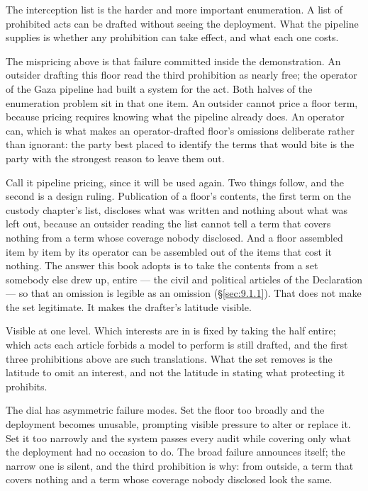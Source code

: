 
The interception list is the harder and more important enumeration. A list of prohibited acts can be drafted without seeing the deployment. What the pipeline supplies is whether any prohibition can take effect, and what each one costs.

The mispricing above is that failure committed inside the demonstration. An outsider drafting this floor read the third prohibition as nearly free; the operator of the Gaza pipeline had built a system for the act. Both halves of the enumeration problem sit in that one item. An outsider cannot price a floor term, because pricing requires knowing what the pipeline already does. An operator can, which is what makes an operator-drafted floor's omissions deliberate rather than ignorant: the party best placed to identify the terms that would bite is the party with the strongest reason to leave them out.

Call it pipeline pricing, since it will be used again. Two things follow, and the second is a design ruling. Publication of a floor's contents, the first term on the custody chapter's list, discloses what was written and nothing about what was left out, because an outsider reading the list cannot tell a term that covers nothing from a term whose coverage nobody disclosed. And a floor assembled item by item by its operator can be assembled out of the items that cost it nothing. The answer this book adopts is to take the contents from a set somebody else drew up, entire — the civil and political articles of the Declaration — so that an omission is legible as an omission (§\ref{sec:9.1.1}). That does not make the set legitimate. It makes the drafter's latitude visible.

Visible at one level. Which interests are in is fixed by taking the half entire; which acts each article forbids a model to perform is still drafted, and the first three prohibitions above are such translations. What the set removes is the latitude to omit an interest, and not the latitude in stating what protecting it prohibits.

The dial has asymmetric failure modes. Set the floor too broadly and the deployment becomes unusable, prompting visible pressure to alter or replace it. Set it too narrowly and the system passes every audit while covering only what the deployment had no occasion to do. The broad failure announces itself; the narrow one is silent, and the third prohibition is why: from outside, a term that covers nothing and a term whose coverage nobody disclosed look the same.

